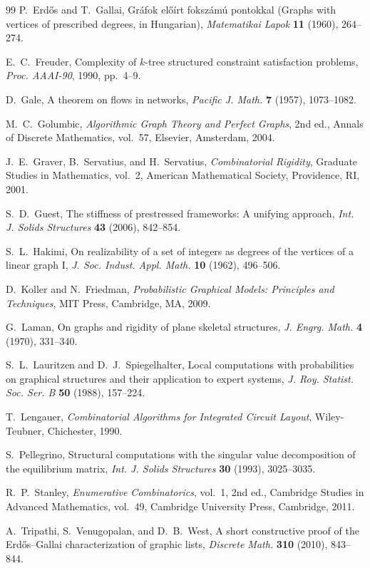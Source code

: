 \documentclass[12pt]{article}
\numberwithin{equation}{section}
\begin{document}
\begin{thebibliography}{99}
P.~Erd\H{o}s and T.~Gallai,
\newblock Gr\'afok el\H{o}\'irt foksz\'am\'u pontokkal (Graphs with vertices of prescribed degrees, in Hungarian),
\newblock \emph{Matematikai Lapok} \textbf{11} (1960), 264--274.

E.~C.~Freuder,
\newblock Complexity of $k$-tree structured constraint satisfaction problems,
\newblock \emph{Proc. AAAI-90}, 1990, pp.~4--9.

D.~Gale,
\newblock A theorem on flows in networks,
\newblock \emph{Pacific J. Math.} \textbf{7} (1957), 1073--1082.

M.~C.~Golumbic,
\newblock \emph{Algorithmic Graph Theory and Perfect Graphs}, 2nd ed.,
\newblock Annals of Discrete Mathematics, vol.~57, Elsevier, Amsterdam, 2004.

J.~E.~Graver, B.~Servatius, and H.~Servatius,
\newblock \emph{Combinatorial Rigidity},
\newblock Graduate Studies in Mathematics, vol.~2, American Mathematical Society, Providence, RI, 2001.

S.~D.~Guest,
\newblock The stiffness of prestressed frameworks: A unifying approach,
\newblock \emph{Int. J. Solids Structures} \textbf{43} (2006), 842--854.

S.~L.~Hakimi,
\newblock On realizability of a set of integers as degrees of the vertices of a linear graph I,
\newblock \emph{J. Soc. Indust. Appl. Math.} \textbf{10} (1962), 496--506.

D.~Koller and N.~Friedman,
\newblock \emph{Probabilistic Graphical Models: Principles and Techniques},
\newblock MIT Press, Cambridge, MA, 2009.

G.~Laman,
\newblock On graphs and rigidity of plane skeletal structures,
\newblock \emph{J. Engrg. Math.} \textbf{4} (1970), 331--340.

S.~L.~Lauritzen and D.~J.~Spiegelhalter,
\newblock Local computations with probabilities on graphical structures and their application to expert systems,
\newblock \emph{J. Roy. Statist. Soc. Ser. B} \textbf{50} (1988), 157--224.

T.~Lengauer,
\newblock \emph{Combinatorial Algorithms for Integrated Circuit Layout},
\newblock Wiley-Teubner, Chichester, 1990.

S.~Pellegrino,
\newblock Structural computations with the singular value decomposition of the equilibrium matrix,
\newblock \emph{Int. J. Solids Structures} \textbf{30} (1993), 3025--3035.

R.~P.~Stanley,
\newblock \emph{Enumerative Combinatorics}, vol.~1, 2nd ed.,
\newblock Cambridge Studies in Advanced Mathematics, vol.~49, Cambridge University Press, Cambridge, 2011.

A.~Tripathi, S.~Venugopalan, and D.~B.~West,
\newblock A short constructive proof of the Erd\H{o}s--Gallai characterization of graphic lists,
\newblock \emph{Discrete Math.} \textbf{310} (2010), 843--844.

\end{thebibliography}
\end{document}
